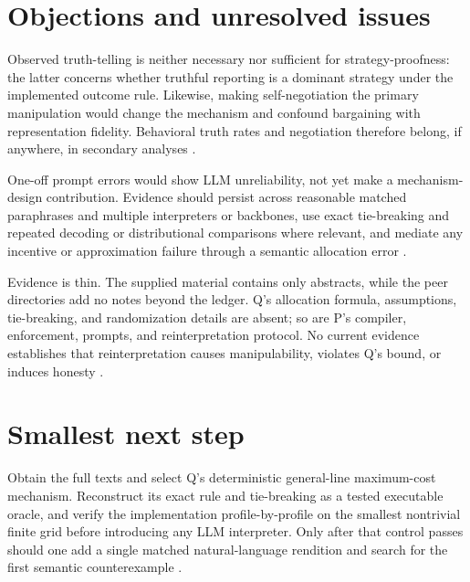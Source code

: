 \documentclass{article}
\begin{document}
\section{Objections and unresolved issues}

Observed truth-telling is neither necessary nor sufficient for strategy-proofness: the latter concerns whether truthful reporting is a dominant strategy under the implemented outcome rule.  Likewise, making self-negotiation the primary manipulation would change the mechanism and confound bargaining with representation fidelity.  Behavioral truth rates and negotiation therefore belong, if anywhere, in secondary analyses .

One-off prompt errors would show LLM unreliability, not yet make a mechanism-design contribution.  Evidence should persist across reasonable matched paraphrases and multiple interpreters or backbones, use exact tie-breaking and repeated decoding or distributional comparisons where relevant, and mediate any incentive or approximation failure through a semantic allocation error .

Evidence is thin.  The supplied material contains only abstracts, while the peer directories add no notes beyond the ledger.  Q's allocation formula, assumptions, tie-breaking, and randomization details are absent; so are P's compiler, enforcement, prompts, and reinterpretation protocol.  No current evidence establishes that reinterpretation causes manipulability, violates Q's bound, or induces honesty .

\section{Smallest next step}

Obtain the full texts and select Q's deterministic general-line maximum-cost mechanism.  Reconstruct its exact rule and tie-breaking as a tested executable oracle, and verify the implementation profile-by-profile on the smallest nontrivial finite grid before introducing any LLM interpreter.  Only after that control passes should one add a single matched natural-language rendition and search for the first semantic counterexample .
\end{document}

